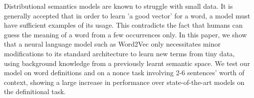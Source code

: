 Distributional semantics models are known to struggle with small data. It is generally accepted that in order to learn 'a good vector' for a word, a model must have sufficient examples of its usage. This contradicts the fact that humans can guess the meaning of a word from a few occurrences only.  In this paper, we show that a neural language model such as Word2Vec only necessitates minor modifications to its standard architecture to learn new terms from tiny data, using background knowledge from a previously learnt semantic space. We test our model on word definitions and on a nonce task involving 2-6 sentences' worth of context, showing a large increase in performance over state-of-the-art models on the definitional task.
